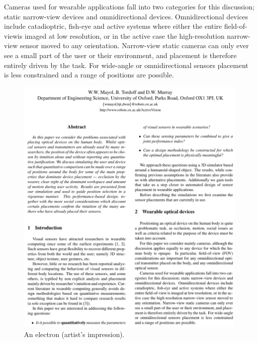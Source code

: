 Cameras used for wearable applications fall into two categories for this discussion; static narrow-view devices and omnidirectional devices. Omnidirectional devices include catadioptric, fish-eye and active systems where either the entire field-of-viewis imaged at low resolution, or in the active case the high-resolution narrow-view sensor moved to any orientation. Narrow-view static cameras can only ever see a small part of the user or their environment, and placement is therefore entirely driven by the task. For wide-angle or omnidirectional sensors placement is less constrained and a range of positions are possible. 
\begin{figure}[htbp]
	\centering
		\includegraphics[page=3]{Figures/mayol_etal_ouel224101_cropped.pdf}
	\caption[An Electron]{An electron (artist's impression).}
	\label{fig:Electron}
\end{figure}

